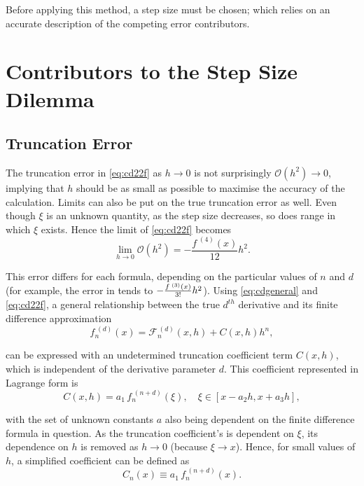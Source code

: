 Before applying this method, a step size must be chosen; which relies on an accurate description of the competing error contributors.

\section{Contributors to the Step Size Dilemma}

\subsection{Truncation Error}

The truncation error in \cref{eq:cd22f} as $h\!\to\!0$ is not surprisingly $\mathcal{O}(h^2)\!\to\!0$, implying that $h$ should be as small as possible to maximise the accuracy of the calculation.
Limits can also be put on the true truncation error as well.
Even though $\xi$ is an unknown quantity, as the step size decreases, so does range in which $\xi$ exists.
Hence the limit of \cref{eq:cd22f} becomes
\begin{equation}
\lim_{h \to 0}\mathcal{O}(h^2) =  - \frac{f^{\;(4)}(x)}{12}h^2.
\end{equation}

This error differs for each formula, depending on the particular values of $n$ and $d$ (for example, the error in  tends to $\cramped{-\frac{f^{\;(3)}(x)}{3!}h^2}$).
Using \cref{eq:cdgeneral} and \cref{eq:cd22f}, a general relationship between the true $d^{th}$ derivative and its finite difference approximation
\begin{equation}
 f_n^{\;(d)}(x) = \mathcal{F}_n^{\,(d)}(x,h) + C(x,h)h^n,\label{eq:cdadj}
\end{equation}

can be expressed with an undetermined truncation coefficient term $C(x,h)$, which is independent of the derivative parameter $d$.
This coefficient represented in Lagrange form is
\begin{equation}
C(x,h) = a_1\,f_n^{\;(n+d)}(\xi), \quad \xi \in [x-a_2h,x+a_3h],\label{eq:cdcxh}
\end{equation}

with the set of unknown constants $a$ also being dependent on the finite difference formula in question.
As the truncation coefficient's is dependent on $\xi$, its dependence on $h$ is removed as $h\!\to\!0$ (because $\xi\!\to\!x$).
Hence, for small values of $h$, a simplified coefficient can be defined as
\begin{equation}
 C_n(x) \equiv a_1\,f_n^{\;(n+d)}(x).
\end{equation}

